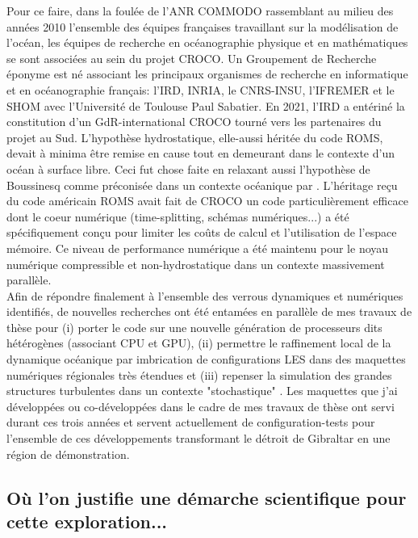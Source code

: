 Pour ce faire, dans la foulée de l’ANR COMMODO rassemblant au milieu des années 2010 l’ensemble des équipes françaises travaillant sur la modélisation de l’océan, les équipes de recherche en océanographie physique et en mathématiques se sont associées au sein du projet CROCO. Un Groupement de Recherche éponyme est né associant les principaux organismes de recherche en informatique et en océanographie français: l’IRD, INRIA, le CNRS-INSU, l’IFREMER et le SHOM avec l'Université de Toulouse Paul Sabatier. En 2021, l’IRD a entériné la constitution d’un GdR-international CROCO tourné vers les partenaires du projet au Sud. L'hypothèse hydrostatique, elle-aussi héritée du code ROMS, devait à minima être remise en cause tout en demeurant dans le contexte d'un océan à surface libre. Ceci fut chose faite en relaxant aussi l'hypothèse de Boussinesq comme préconisée dans un contexte océanique par \cite{Auclair2018}. L'héritage reçu du code américain ROMS \citep{shchepetkin_regional_2005} avait fait de CROCO un code particulièrement efficace dont le coeur numérique (time-splitting, schémas numériques...) a été spécifiquement conçu pour limiter les coûts de calcul et l'utilisation de l'espace mémoire. Ce niveau de performance numérique a été maintenu pour le noyau numérique compressible et non-hydrostatique dans un contexte massivement parallèle.\\
Afin de répondre finalement à l'ensemble des verrous dynamiques et numériques identifiés, de nouvelles recherches ont été entamées en parallèle de mes travaux de thèse pour (i) porter le code sur une nouvelle génération de processeurs dits hétérogènes (associant CPU et GPU), (ii) permettre le raffinement local de la dynamique océanique par imbrication de configurations LES dans des maquettes numériques régionales très étendues et (iii) repenser la simulation des grandes structures turbulentes dans un contexte "stochastique" \cite{memin_fluid_2014}. Les maquettes que j'ai développées ou co-développées dans le cadre de mes travaux de thèse ont servi durant ces trois années et servent actuellement de configuration-tests pour l'ensemble de ces développements transformant le détroit de Gibraltar en une région de démonstration. \\
\color{blue}

\subsection{Où l'on justifie une démarche scientifique pour cette exploration...}

